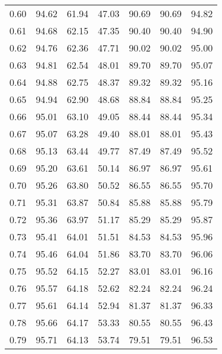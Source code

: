 \begin{tabular}{|c|c|c|c|c|c|c|}
      0.60 &     94.62 &     61.94 &      47.03 &   90.69 &      90.69 &         94.82 \\
      0.61 &     94.68 &     62.15 &      47.35 &   90.40 &      90.40 &         94.90 \\
      0.62 &     94.76 &     62.36 &      47.71 &   90.02 &      90.02 &         95.00 \\
      0.63 &     94.81 &     62.54 &      48.01 &   89.70 &      89.70 &         95.07 \\
      0.64 &     94.88 &     62.75 &      48.37 &   89.32 &      89.32 &         95.16 \\
      0.65 &     94.94 &     62.90 &      48.68 &   88.84 &      88.84 &         95.25 \\
      0.66 &     95.01 &     63.10 &      49.05 &   88.44 &      88.44 &         95.34 \\
      0.67 &     95.07 &     63.28 &      49.40 &   88.01 &      88.01 &         95.43 \\
      0.68 &     95.13 &     63.44 &      49.77 &   87.49 &      87.49 &         95.52 \\
      0.69 &     95.20 &     63.61 &      50.14 &   86.97 &      86.97 &         95.61 \\
      0.70 &     95.26 &     63.80 &      50.52 &   86.55 &      86.55 &         95.70 \\
      0.71 &     95.31 &     63.87 &      50.84 &   85.88 &      85.88 &         95.79 \\
      0.72 &     95.36 &     63.97 &      51.17 &   85.29 &      85.29 &         95.87 \\
      0.73 &     95.41 &     64.01 &      51.51 &   84.53 &      84.53 &         95.96 \\
      0.74 &     95.46 &     64.04 &      51.86 &   83.70 &      83.70 &         96.06 \\
      0.75 &     95.52 &     64.15 &      52.27 &   83.01 &      83.01 &         96.16 \\
      0.76 &     95.57 &     64.18 &      52.62 &   82.24 &      82.24 &         96.24 \\
      0.77 &     95.61 &     64.14 &      52.94 &   81.37 &      81.37 &         96.33 \\
      0.78 &     95.66 &     64.17 &      53.33 &   80.55 &      80.55 &         96.43 \\
      0.79 &     95.71 &     64.13 &      53.74 &   79.51 &      79.51 &         96.53 \\

\end{tabular}
